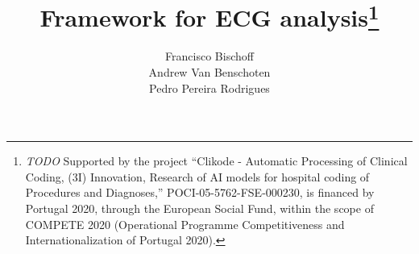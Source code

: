\documentclass[runningheads]{llncs}
\begin{document}
%
\title{Framework for ECG analysis\thanks{\emph{TODO} Supported by the
project ``Clikode - Automatic Processing of Clinical Coding, (3I)
Innovation, Research of AI models for hospital coding of Procedures and
Diagnoses,'' POCI-05-5762-FSE-000230, is financed by Portugal 2020,
through the European Social Fund, within the scope of COMPETE 2020
(Operational Programme Competitiveness and Internationalization of
Portugal 2020).}}
%
%
%
\author{  Francisco Bischoff\\  Andrew Van
Benschoten\\  Pedro Pereira
Rodrigues }

%


\maketitle              %
%
\end{document}
